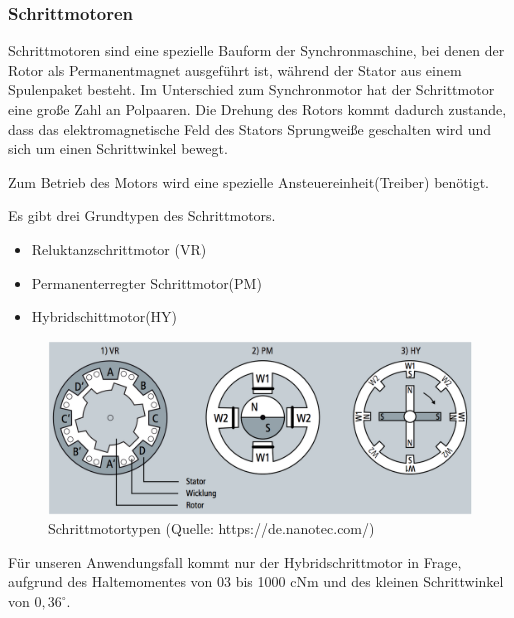 \renewcommand{\autoren}{Severin Schendel	}
\newpage

\subsubsection{Schrittmotoren}

Schrittmotoren sind eine spezielle Bauform der Synchronmaschine, bei denen der Rotor als Permanentmagnet ausgeführt ist, während der Stator aus einem Spulenpaket besteht. Im Unterschied zum Synchronmotor hat der Schrittmotor eine große Zahl an Polpaaren. Die Drehung des Rotors kommt dadurch zustande, dass das elektromagnetische Feld des Stators Sprungweiße geschalten wird und sich um einen Schrittwinkel bewegt.

Zum Betrieb des Motors wird eine spezielle Ansteuereinheit(Treiber) benötigt.


Es gibt drei Grundtypen des Schrittmotors.

\begin{itemize}
	\item Reluktanzschrittmotor (VR)
	\item Permanenterregter Schrittmotor(PM)
	\item Hybridschittmotor(HY)
\end{itemize}

\begin{figure}[h]  %
\centering\includegraphics[width=1.0\textwidth]{images/Schrittmotortypen.png}
\caption{Schrittmotortypen \newline (Quelle: https://de.nanotec.com/)}
\end{figure}

Für unseren Anwendungsfall kommt nur der Hybridschrittmotor in Frage, aufgrund des Haltemomentes von 03 bis 1000 cNm und des kleinen Schrittwinkel von $0,36^\circ$.

